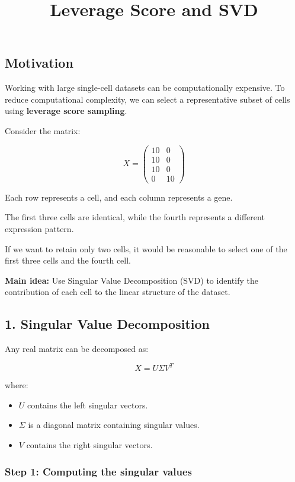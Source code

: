 \documentclass[
]{article}
\title{Leverage Score and SVD}
\author{}
\date{\vspace{-2.5em}}
\providecommand{\tightlist}{%
  \setlength{\itemsep}{0pt}\setlength{\parskip}{0pt}}
\begin{document}
\maketitle

\subsection{Motivation}\label{motivation}

Working with large single-cell datasets can be computationally
expensive. To reduce computational complexity, we can select a
representative subset of cells using \textbf{leverage score sampling}.

Consider the matrix:

\[
X =
\begin{pmatrix}
10 & 0 \\
10 & 0 \\
10 & 0 \\
0 & 10
\end{pmatrix}
\]

Each row represents a cell, and each column represents a gene.

The first three cells are identical, while the fourth represents a
different expression pattern.

If we want to retain only two cells, it would be reasonable to select
one of the first three cells and the fourth cell.

\textbf{Main idea:} Use Singular Value Decomposition (SVD) to identify
the contribution of each cell to the linear structure of the dataset.

\subsection{1. Singular Value
Decomposition}\label{singular-value-decomposition}

Any real matrix can be decomposed as:

\[
\boxed{X = U\Sigma V^T}
\]

where:

\begin{itemize}
\tightlist
\item
  \(U\) contains the left singular vectors.
\item
  \(\Sigma\) is a diagonal matrix containing singular values.
\item
  \(V\) contains the right singular vectors.
\end{itemize}

\subsubsection{Step 1: Computing the singular
values}\label{step-1-computing-the-singular-values}
\end{document}

